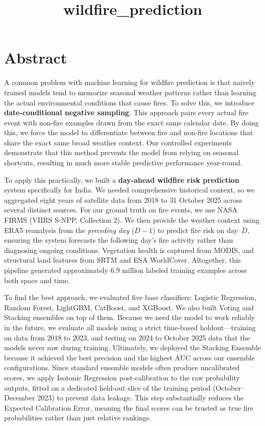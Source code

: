 \documentclass[11pt]{article}
\title{wildfire\_prediction}
\author{}
\date{}
\begin{document}
\sloppy

\maketitle

\section*{Abstract}

A common problem with machine learning for wildfire prediction is that naively trained models tend to memorize seasonal weather patterns rather than learning the actual environmental conditions that cause fires. To solve this, we introduce \textbf{date-conditional negative sampling}. This approach pairs every actual fire event with non-fire examples drawn from the exact same calendar date. By doing this, we force the model to differentiate between fire and non-fire locations that share the exact same broad weather context. Our controlled experiments demonstrate that this method prevents the model from relying on seasonal shortcuts, resulting in much more stable predictive performance year-round.

To apply this practically, we built a \textbf{day-ahead wildfire risk prediction} system specifically for India. We needed comprehensive historical context, so we aggregated eight years of satellite data from 2018 to 31 October 2025 across several distinct sources. For our ground truth on fire events, we use NASA FIRMS (VIIRS S-NPP, Collection 2). We then provide the weather context using ERA5 reanalysis from the \textit{preceding day} ($D{-}1$) to predict fire risk on day~$D$, ensuring the system forecasts the following day's fire activity rather than diagnosing ongoing conditions. Vegetation health is captured from MODIS, and structural land features from SRTM and ESA WorldCover. Altogether, this pipeline generated approximately 6.9 million labeled training examples across both space and time.

To find the best approach, we evaluated five base classifiers: Logistic Regression, Random Forest, LightGBM, CatBoost, and XGBoost. We also built Voting and Stacking ensembles on top of them. Because we need the model to work reliably in the future, we evaluate all models using a strict time-based holdout---training on data from 2018 to 2023, and testing on 2024 to October 2025 data that the models never saw during training. Ultimately, we deployed the Stacking Ensemble because it achieved the best precision and the highest AUC across our ensemble configurations. Since standard ensemble models often produce uncalibrated scores, we apply Isotonic Regression post-calibration to the raw probability outputs, fitted on a dedicated held-out slice of the training period (October--December 2023) to prevent data leakage. This step substantially reduces the Expected Calibration Error, meaning the final scores can be trusted as true fire probabilities rather than just relative rankings.
\end{document}
